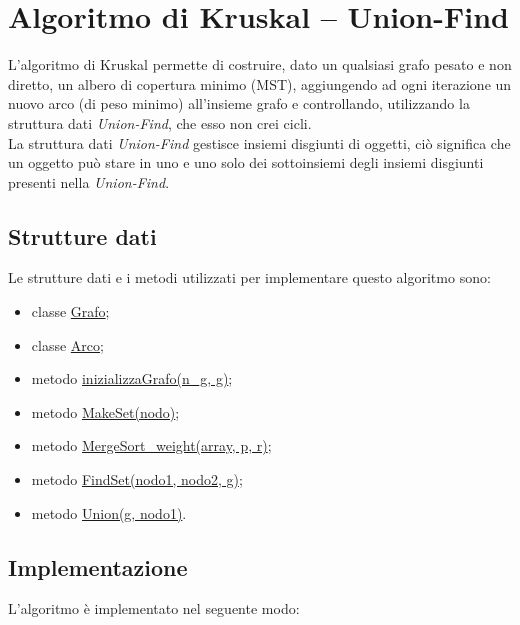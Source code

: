 \section{Algoritmo di Kruskal -- Union-Find}
\label{Algoritmo_di_Kruskal_Union-Find}

L'algoritmo di Kruskal permette di costruire, dato un qualsiasi grafo pesato e non diretto, un albero di copertura minimo (MST), aggiungendo ad ogni iterazione un nuovo arco (di peso minimo) all'insieme grafo e controllando, utilizzando la struttura dati \textit{Union-Find}, che esso non crei cicli. \\
La struttura dati \textit{Union-Find} gestisce insiemi disgiunti di oggetti, ciò significa che un oggetto può stare in uno e uno solo dei sottoinsiemi degli insiemi disgiunti presenti nella \textit{Union-Find}.

\subsection{Strutture dati}
\label{struttureDati3}

Le strutture dati e i metodi utilizzati per implementare questo algoritmo sono:

\begin{itemize}
    \item classe \hyperlink{subsection.2.2}{Grafo};
    \item classe \hyperlink{subsection.2.1}{Arco};
    \item metodo \hyperlink{inizializzagrafo}{inizializzaGrafo(n\_g, g)};
    \item metodo \hyperlink{makeset}{MakeSet(nodo)};
    \item metodo \hyperlink{mergesort}{MergeSort\_weight(array, p, r)};
    \item metodo \hyperlink{findset}{FindSet(nodo1, nodo2, g)};
    \item metodo \hyperlink{union}{Union(g, nodo1)}.
\end{itemize}



\subsection{Implementazione}
\label{implementazione3}

L'algoritmo è implementato nel seguente modo:

